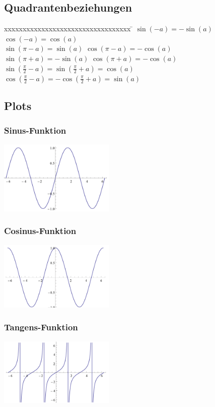 \subsection{Quadrantenbeziehungen}
\begin{tabbing}
	xxxxxxxxxxxxxxxxxxxxxxxxxxxxxxxxxx \= \kill
	$\sin(-a)=-\sin(a)$ \> $\cos(-a)=\cos(a)$\\
	$\sin(\pi - a)=\sin(a)$ \> $\cos(\pi - a)=-\cos(a)$\\
	$\sin(\pi + a)=-\sin(a)$ \> $\cos(\pi +a)=-\cos(a)$\\
	$\sin\left(\frac{\pi}{2}-a \right)=\sin\left(\frac{\pi}{2}+a \right)=\cos(a)$ \>
	$\cos\left(\frac{\pi}{2}-a \right)=-\cos\left(\frac{\pi}{2}+a \right)=\sin(a)$  
\end{tabbing}

\subsection{Plots}
\begin{multicols}{3}
	\subsubsection{Sinus-Funktion}
	\includegraphics[width=5.5cm]{images/sin.png}
	\subsubsection{Cosinus-Funktion}
	\includegraphics[width=5.5cm]{images/cos.png}
	\subsubsection{Tangens-Funktion}
	\includegraphics[width=5.5cm]{images/tan.png}
\end{multicols}